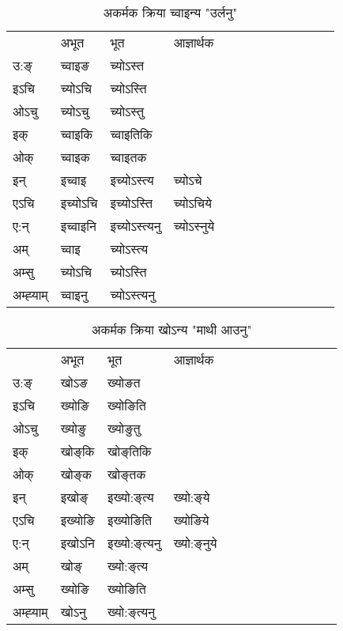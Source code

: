 \begin{table}[H]
\centering
\caption{\label{on.vi} अकर्मक क्रिया  च्‍वाइन्य  "उर्लनु"  }
\begin{tabular}{l|l|l|l|l|l|l|l|l|l|l|l|l}  \toprule
&अभूत & भूत & आज्ञार्थक \\ 
उ:ङ्‌ &च्‍वाइङ &च्योऽस्त \\ 
इऽचि &च्योऽचि &च्योऽस्ति   \\ 
ओऽचु &च्योऽचु &च्योऽस्तु   \\ 
इक् &च्‍वाइकि &च्‍वाइतिकि   \\ 
ओक् &च्‍वाइक &च्‍वाइतक   \\ 
इन् & इच्‍वाइ & इच्योऽस्त्य &च्योऽचे  \\ 
एऽचि & इच्योऽचि & इच्योऽस्ति &च्योऽचिये    \\ 
ए:न् & इच्‍वाइनि  & इच्योऽस्त्यनु &च्योऽस्‍नुये  \\ 
अम् & च्‍वाइ & च्योऽस्त्य   \\ 
अम्सु & च्योऽचि & च्योऽस्ति   \\ 
अम्ह्‍याम् & च्‍वाइनु  & च्योऽस्त्यनु \\ 
\bottomrule
\end{tabular}
\end{table}


\begin{table}[H]
\centering
\caption{\label{oŋ.vi} अकर्मक क्रिया  खोऽन्य  "माथी आउनु"  }
\begin{tabular}{l|l|l|l|l|l|l|l|l|l|l|l|l}  \toprule
&अभूत & भूत & आज्ञार्थक \\ 
उ:ङ्‌ &खोऽङ &ख्योङत \\ 
इऽचि &ख्योङि &ख्योङिति   \\ 
ओऽचु &ख्योङु &ख्योङुतु   \\ 
इक् &खोङ्‌कि &खोङ्‌तिकि   \\ 
ओक् &खोङ्‌क &खोङ्‌तक   \\ 
इन् & इखोङ्‌ & इख्यो:ङ्‌त्य &ख्यो:ङ्‌ये  \\ 
एऽचि & इख्योङि & इख्योङिति &ख्योङिये    \\ 
ए:न् & इखोऽनि  & इख्यो:ङ्‌त्यनु &ख्यो:ङ्‌नुये  \\ 
अम् & खोङ्‌ & ख्यो:ङ्‌त्य   \\ 
अम्सु & ख्योङि & ख्योङिति   \\ 
अम्ह्‍याम् & खोऽनु  & ख्यो:ङ्‌त्यनु \\ 
\bottomrule
\end{tabular}
\end{table}



